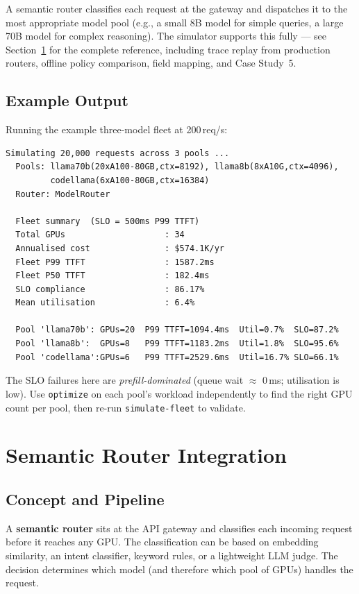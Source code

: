 \documentclass[11pt,a4paper]{article}
\begin{document}
A semantic router classifies each request at the gateway and dispatches it
to the most appropriate model pool (e.g., a small 8B model for simple
queries, a large 70B model for complex reasoning).  The simulator supports
this fully --- see Section~\ref{sec:semantic-full} for the complete
reference, including trace replay from production routers, offline policy
comparison, field mapping, and Case Study~5.

\subsection{Example Output}

Running the example three-model fleet at 200\,req/s:

\begin{lstlisting}[style=output]
Simulating 20,000 requests across 3 pools ...
  Pools: llama70b(20xA100-80GB,ctx=8192), llama8b(8xA10G,ctx=4096),
         codellama(6xA100-80GB,ctx=16384)
  Router: ModelRouter

  Fleet summary  (SLO = 500ms P99 TTFT)
  Total GPUs                    : 34
  Annualised cost               : $574.1K/yr
  Fleet P99 TTFT                : 1587.2ms
  Fleet P50 TTFT                : 182.4ms
  SLO compliance                : 86.17%
  Mean utilisation              : 6.4%

  Pool 'llama70b': GPUs=20  P99 TTFT=1094.4ms  Util=0.7%  SLO=87.2%
  Pool 'llama8b':  GPUs=8   P99 TTFT=1183.2ms  Util=1.8%  SLO=95.6%
  Pool 'codellama':GPUs=6   P99 TTFT=2529.6ms  Util=16.7% SLO=66.1%
\end{lstlisting}

The SLO failures here are \emph{prefill-dominated} (queue wait $\approx$
0\,ms; utilisation is low).  Use \texttt{optimize} on each pool's workload
independently to find the right GPU count per pool, then re-run
\texttt{simulate-fleet} to validate.

\section{Semantic Router Integration}
\label{sec:semantic-full}

\subsection{Concept and Pipeline}

A \textbf{semantic router} sits at the API gateway and classifies each
incoming request before it reaches any GPU.  The classification can be
based on embedding similarity, an intent classifier, keyword rules, or a
lightweight LLM judge.  The decision determines which model (and therefore
which pool of GPUs) handles the request.
\end{document}
